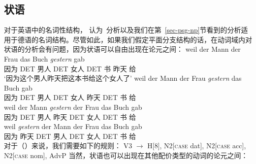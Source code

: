 \subsection{状语}
\label{Abschnitt-Adjunkte-GPSG}

对于英语中的名词性结构，\citet[]{GKPS85a} 认为\xbar~分析以及我们在第~\ref{sec-psg-np}节看到的分析适用于德语的名词结构。尽管如此，如果我们假定平面分支结构的话，在动词域内对状语的分析会有问题，因为状语可以自由出现在论元之间：
\eal
\ex 
\gll weil der Mann der Frau das Buch \emph{gestern} gab\\
	 因为 DET 男人 DET 女人 DET 书 昨天 给\\
\glt `因为这个男人昨天把这本书给这个女人了'
\ex 
\gll weil der Mann der Frau \emph{gestern} das Buch gab\\
	 因为 DET 男人 DET 女人 昨天 DET 书 给\\
\ex 
\gll weil der Mann \emph{gestern} der Frau das Buch gab\\
	 因为 DET 男人 昨天 DET 女人 DET 书 给\\
\ex 
\gll weil \emph{gestern} der Mann der Frau das Buch gab\\
	 因为 昨天 DET 男人 DET 女人 DET 书 给\\
\zl
对于（）来说，我们需要如下的规则：
\ea
\label{regel-ditransitiv-adv}
V3  $\to$ H[8], N2[\textsc{case} dat], N2[\textsc{case} acc], N2[\textsc{case} nom], AdvP
\z
当然，状语也可以出现在其他配价类型的动词的论元之间：
